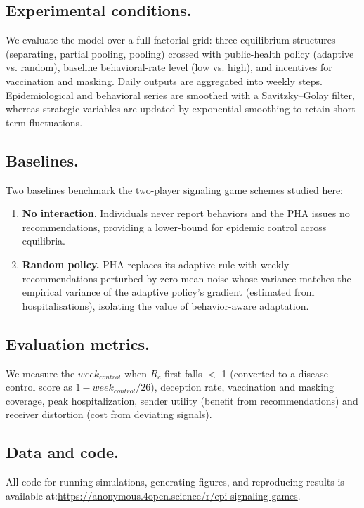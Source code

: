 \documentclass[sigconf,review]{acmart}
\begin{document}
\subsection{Experimental conditions.}
We evaluate the model over a full factorial grid: three equilibrium structures (separating, partial pooling, pooling) crossed with public-health policy (adaptive vs. random), baseline behavioral-rate level (low vs. high), and incentives for vaccination and masking.
Daily outputs are aggregated into weekly steps. Epidemiological and behavioral series are smoothed with a Savitzky–Golay filter, whereas strategic variables are updated by exponential smoothing to retain short-term fluctuations.

\subsection{Baselines.} Two baselines benchmark the two-player signaling game schemes studied here:

\begin{enumerate}
\item {\bf No interaction}. Individuals never report behaviors and the PHA issues no recommendations, providing a lower-bound for epidemic control across equilibria.

\item {\bf Random policy.} PHA replaces its adaptive rule with weekly recommendations perturbed by zero-mean noise whose variance matches the empirical variance of the adaptive policy’s gradient (estimated from hospitalisations), isolating the value of behavior-aware adaptation.
\end{enumerate}

\subsection{Evaluation metrics.} We measure the $week_{control}$  when $R_c$ first falls $<$ 1 (converted to a disease-control score as $1-week_{control}/26$), deception rate, vaccination and masking coverage, peak hospitalization, sender utility (benefit from recommendations) and receiver distortion (cost from deviating signals). 

\subsection{Data and code.}
All code for running simulations, generating figures, and reproducing results is available at:\url{https://anonymous.4open.science/r/epi-signaling-games}.
\end{document}
